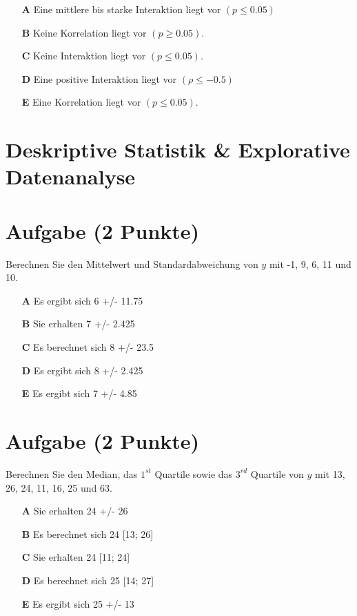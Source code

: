 \documentclass[a4paper, 9pt]{scrartcl}\usepackage[]{graphicx}\usepackage[]{xcolor}
\begin{document}
\begin{enumerate}
\item [\textbf{A} \msquare] Eine mittlere bis starke Interaktion liegt vor $(p \leq 0.05)$
\item [\textbf{B} \msquare] Keine Korrelation liegt vor $(p \geq 0.05)$.
\item [\textbf{C} \msquare] Keine Interaktion liegt vor $(p \leq 0.05)$.
\item [\textbf{D} \msquare] Eine positive Interaktion liegt vor $(\rho \leq -0.5)$ 
\item [\textbf{E} \msquare] Eine Korrelation liegt vor $(p \leq 0.05)$.
\end{enumerate} 
\section*{Deskriptive Statistik \& Explorative Datenanalyse}

\section{Aufgabe \hfill (2 Punkte)}




Berechnen Sie den Mittelwert und Standardabweichung von $y$ mit -1, 9, 6, 11 und 10.



\begin{enumerate}
\item [\textbf{A} \msquare] Es ergibt sich 6 +/- 11.75
\item [\textbf{B} \msquare] Sie erhalten 7 +/- 2.425
\item [\textbf{C} \msquare] Es berechnet sich 8 +/- 23.5
\item [\textbf{D} \msquare] Es ergibt sich 8 +/- 2.425
\item [\textbf{E} \msquare] Es ergibt sich 7 +/- 4.85
\end{enumerate} 

\section{Aufgabe \hfill (2 Punkte)}




Berechnen Sie den Median, das $1^{st}$ Quartile sowie das $3^{rd}$ Quartile von $y$ mit 13, 26, 24, 11, 16, 25 und 63.




\begin{enumerate}
\item [\textbf{A} \msquare] Sie erhalten 24 +/- 26
\item [\textbf{B} \msquare] Es berechnet sich 24 [13; 26]
\item [\textbf{C} \msquare] Sie erhalten 24 [11; 24]
\item [\textbf{D} \msquare] Es berechnet sich 25 [14; 27]
\item [\textbf{E} \msquare] Es ergibt sich 25 +/- 13
\end{enumerate} 
\end{document}
